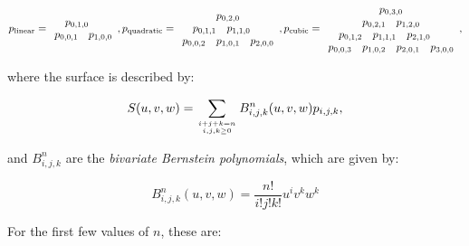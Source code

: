 \begin{equation}
p_{\mathrm{linear}} = \begin{array}{cccc}
& \multicolumn{2}{c}{p_{0,1,0}} & \\
\multicolumn{2}{c}{p_{0,0,1}} & \multicolumn{2}{c}{p_{1,0,0}}
\end{array},
p_{\mathrm{quadratic}} = \begin{array}{cccccc}
\multicolumn{6}{c}{p_{0,2,0}} \\
& \multicolumn{2}{c}{p_{0,1,1}} & \multicolumn{2}{c}{p_{1,1,0}} & \\
\multicolumn{2}{c}{p_{0,0,2}} & \multicolumn{2}{c}{p_{1,0,1}} & \multicolumn{2}{c}{p_{2,0,0}}
\end{array},
p_{\mathrm{cubic}} = \begin{array}{cccccccc}
\multicolumn{8}{c}{p_{0,3,0}} \\
&& \multicolumn{2}{c}{p_{0,2,1}} & \multicolumn{2}{c}{p_{1,2,0}} && \\
& \multicolumn{2}{c}{p_{0,1,2}} & \multicolumn{2}{c}{p_{1,1,1}} & \multicolumn{2}{c}{p_{2,1,0}} & \\
\multicolumn{2}{c}{p_{0,0,3}} & \multicolumn{2}{c}{p_{1,0,2}} & \multicolumn{2}{c}{p_{2,0,1}} & \multicolumn{2}{c}{p_{3,0,0}}
\end{array},
\end{equation}

where the surface is described by:

\begin{equation}
S(u,v,w) = \sum_{i+j+k=n \atop i,j,k \geq 0} B^n_{i,j,k}(u,v,w) p_{i,j,k},
\end{equation}

and \(B^n_{i,j,k}\) are the \emph{bivariate Bernstein polynomials}, which are given by:

\begin{equation}
B^n_{i,j,k}(u,v,w) = \frac{n!}{i!j!k!}u^i v^k w^k
\end{equation}

For the first few values of \(n\), these are:

